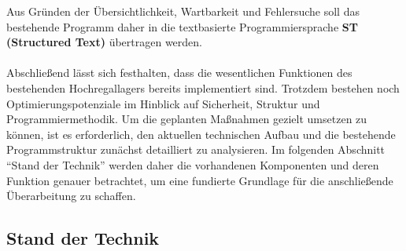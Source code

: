 Aus Gründen der Übersichtlichkeit, Wartbarkeit und Fehlersuche soll das bestehende Programm daher in die textbasierte Programmiersprache \textbf{ST (Structured Text)} übertragen werden.\\\\
Abschließend lässt sich festhalten, dass die wesentlichen Funktionen des bestehenden Hochregallagers bereits implementiert sind. 
Trotzdem bestehen noch Optimierungspotenziale im Hinblick auf Sicherheit, Struktur und Programmiermethodik. 
Um die geplanten Maßnahmen gezielt umsetzen zu können, ist es erforderlich, den aktuellen technischen Aufbau und die bestehende Programmstruktur zunächst detailliert zu analysieren. 
Im folgenden Abschnitt \enquote{Stand der Technik} werden daher die vorhandenen Komponenten und deren Funktion genauer betrachtet, um eine fundierte Grundlage für die anschließende Überarbeitung zu schaffen.
\subsection{Stand der Technik}



